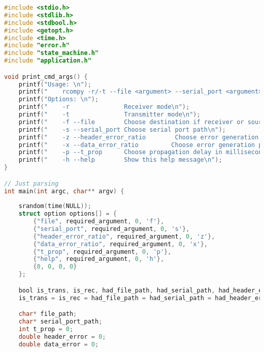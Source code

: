 \begin{lstlisting}[language=C, caption=main.c]
#include <stdio.h>
#include <stdlib.h>
#include <stdbool.h>
#include <getopt.h>
#include <time.h>
#include "error.h"
#include "state_machine.h"
#include "application.h"

void print_cmd_args() {
    printf("Usage: \n");
    printf("    rcompy -r/-t --file <argument> --serial_port <argument> [--fer <argument> --t_prop <argument> --help]\n");
    printf("Options: \n");
    printf("    -r               Receiver mode\n");
    printf("    -t               Transmitter mode\n");
    printf("    -f --file        Choose destination if receiver or source if transmitter\n");
    printf("    -s --serial_port Choose serial port path\n");
    printf("    -z --header_error_ratio        Choose error generation probability in information packets\n");
    printf("    -x --data_error_ratio         Choose error generation probability in information packets\n");
    printf("    -p --t_prop      Choose propagation delay in milliseconds\n");
    printf("    -h --help        Show this help message\n");
}

// Just parsing
int main(int argc, char** argv) {
    
    srandom(time(NULL));
    struct option options[] = {
        {"file", required_argument, 0, 'f'},
        {"serial_port", required_argument, 0, 's'},
        {"header_error_ratio", required_argument, 0, 'z'},
        {"data_error_ratio", required_argument, 0, 'x'},
        {"t_prop", required_argument, 0, 'p'},
        {"help", required_argument, 0, 'h'},
        {0, 0, 0, 0}
    };

    bool is_trans, is_rec, had_file_path, had_serial_path, had_header_error, had_data_error, had_tprop;
    is_trans = is_rec = had_file_path = had_serial_path = had_header_error = had_data_error = had_tprop = false;

    char* file_path;
    char* serial_port_path;
    int t_prop = 0;
    double header_error = 0;
    double data_error = 0;


\end{lstlisting}
